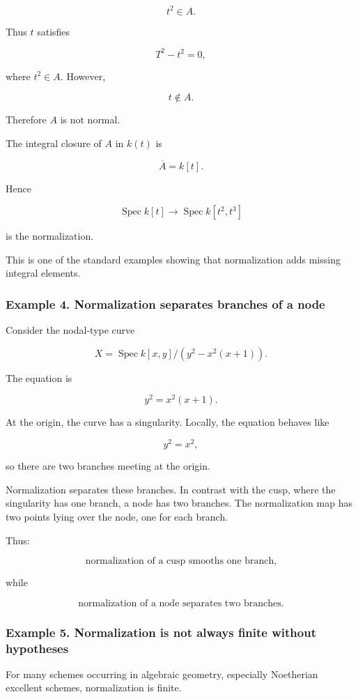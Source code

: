 \documentclass[12pt,a4paper]{article}
\theoremstyle{notespace}
\begin{document}
\[
t^2\in A.
\]

Thus \(t\) satisfies

\[
T^2-t^2=0,
\]

where \(t^2\in A\). However,

\[
t\notin A.
\]

Therefore \(A\) is not normal.

The integral closure of \(A\) in \(k(t)\) is

\[
\overline{A}=k[t].
\]

Hence

\[
\operatorname{Spec}k[t]\to \operatorname{Spec}k[t^2,t^3]
\]

is the normalization.

This is one of the standard examples showing that normalization adds missing integral elements.

\subsubsection{Example 4. Normalization separates branches of a node}

Consider the nodal-type curve

\[
X=\operatorname{Spec}k[x,y]/(y^2-x^2(x+1)).
\]

The equation is

\[
y^2=x^2(x+1).
\]

At the origin, the curve has a singularity. Locally, the equation behaves like

\[
y^2=x^2,
\]

so there are two branches meeting at the origin.

Normalization separates these branches. In contrast with the cusp, where the singularity has one branch, a node has two branches. The normalization map has two points lying over the node, one for each branch.

Thus:

\[
\text{normalization of a cusp smooths one branch,}
\]

while

\[
\text{normalization of a node separates two branches.}
\]

\subsubsection{Example 5. Normalization is not always finite without hypotheses}

For many schemes occurring in algebraic geometry, especially Noetherian excellent schemes, normalization is finite.
\end{document}
